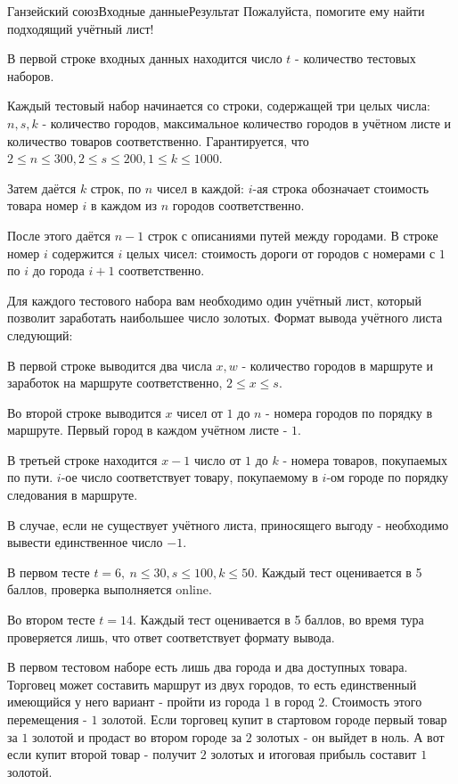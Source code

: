 \begin{problem}{Ганзейский союз}{Входные данные}{Результат}{}
Пожалуйста, помогите ему найти подходящий учётный лист!

В первой строке входных данных находится число $t$ - количество тестовых наборов.

Каждый тестовый набор начинается со строки, содержащей три целых числа: $n, s, k$ - количество городов, максимальное количество городов в учётном листе и количество товаров соответственно.
Гарантируется, что $2 \le n \le 300, 2 \le s \le 200, 1 \le k \le 1000$.

Затем даётся $k$ строк, по $n$ чисел в каждой: $i$-ая строка обозначает стоимость товара номер $i$ в каждом из $n$ городов соответственно.

После этого даётся $n - 1$ строк с описаниями путей между городами.
В строке номер $i$ содержится $i$ целых чисел: стоимость дороги от городов с номерами с $1$ по $i$ до города $i+1$ соответственно.

Для каждого тестового набора вам необходимо один учётный лист, который позволит заработать наибольшее число золотых.
Формат вывода учётного листа следующий:

В первой строке выводится два числа $x, w$ - количество городов в маршруте и заработок на маршруте соответственно, $2 \le x \le s$.

Во второй строке выводится $x$ чисел от $1$ до $n$ - номера городов по порядку в маршруте. Первый город в каждом учётном листе - $1$.

В третьей строке находится $x - 1$ число от $1$ до $k$ - номера товаров, покупаемых по пути. $i$-ое число соответствует товару, покупаемому в $i$-ом городе по порядку следования в маршруте.

В случае, если не существует учётного листа, приносящего выгоду - необходимо вывести единственное число $-1$.



В первом тесте $t = 6, \ n \le 30, s \le 100, k \le 50$. Каждый тест оценивается в 5 баллов, проверка выполняется online.

Во втором тесте $t = 14$. Каждый тест оценивается в 5 баллов, во время тура проверяется лишь, что ответ соответствует формату вывода.

\Examples
\begin{example}
%
\end{example}

В первом тестовом наборе есть лишь два города и два доступных товара. Торговец может составить маршрут из двух городов, то есть единственный имеющийся у него вариант - пройти из города $1$ в город $2$. Стоимость этого перемещения - $1$ золотой. Если торговец купит в стартовом городе первый товар за $1$ золотой и продаст во втором городе за $2$ золотых - он выйдет в ноль. А вот если купит второй товар - получит $2$ золотых и итоговая прибыль составит $1$ золотой.


\end{problem}
